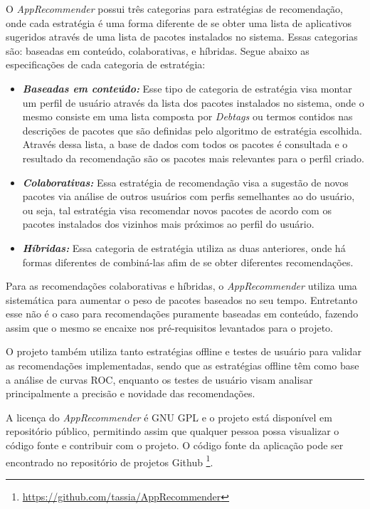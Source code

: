   O \textit{AppRecommender} possui três categorias para estratégias de recomendação, onde cada
  estratégia é uma forma diferente de se obter uma lista de aplicativos sugeridos
  através de uma lista de pacotes instalados no sistema. Essas categorias são: baseadas em conteúdo,
  colaborativas, e híbridas. Segue abaixo as especificações de cada categoria de estratégia:

  \begin{itemize}
      \item \textit{\textbf{Baseadas em conteúdo:}} Esse tipo de categoria de estratégia
          visa montar um perfil de usuário através da lista dos pacotes instalados no sistema,
          onde o mesmo consiste em uma lista composta por \textit{Debtags} ou termos contidos nas descrições de pacotes que são
          definidas pelo algoritmo de estratégia escolhida. Através dessa lista, a base de dados
          com todos os pacotes é consultada e o resultado da recomendação são os pacotes mais
          relevantes para o perfil criado.
      \item \textit{\textbf{Colaborativas:}} Essa estratégia de recomendação visa
          a sugestão de novos pacotes via análise de outros usuários com perfis
          semelhantes ao do usuário, ou seja, tal estratégia visa recomendar novos
          pacotes de acordo com os pacotes instalados dos vizinhos mais próximos
          ao perfil do usuário.
      \item \textit{\textbf{Híbridas:}} Essa categoria
          de estratégia utiliza as duas anteriores, onde há formas diferentes de combiná-las
          afim de se obter diferentes recomendações.
  \end{itemize}

  Para as recomendações colaborativas e híbridas, o \textit{AppRecommender}
  utiliza uma sistemática para aumentar o peso de pacotes baseados no seu tempo.
  Entretanto esse não é o caso para recomendações puramente baseadas em conteúdo,
  fazendo assim que o mesmo se encaixe nos pré-requisitos levantados para o
  projeto.

  O projeto também utiliza tanto estratégias offline e testes de usuário para
  validar as recomendações implementadas, sendo que as estratégias offline têm como
  base a análise de curvas ROC, enquanto os testes de usuário visam analisar
  principalmente a precisão e novidade das recomendações.

  A licença do \textit{AppRecommender} é GNU GPL e o projeto está disponível em repositório
  público, permitindo assim que qualquer pessoa possa visualizar o código fonte e
  contribuir com o projeto. O código fonte da aplicação pode ser encontrado no
  repositório de projetos Github \footnote{\url{https://github.com/tassia/AppRecommender}}.


